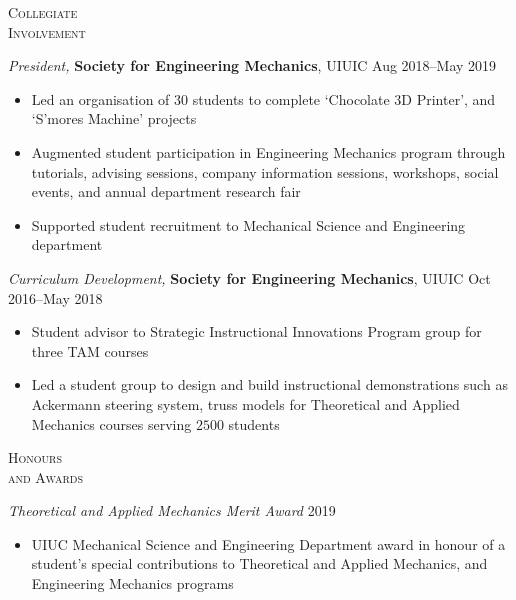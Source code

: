 \documentclass[10pt]{article}
\begin{document}
\begin{multicols}{2}
\textsc{\small Collegiate \\ Involvement}
\columnbreak

{\sl President,} \textbf{Society for Engineering Mechanics}, UIUIC \hfill Aug 2018--May 2019

\vspace{-1.75em}
\begin{itemize}[label=-]
    \setlength\itemsep{-0.25em}
    \item Led an organisation of $30$ students to complete `Chocolate 3D Printer', and `S'mores Machine' projects
    \item Augmented student participation in Engineering Mechanics program through tutorials, advising sessions, company information sessions, workshops, social events, and annual department research fair
    \item Supported student recruitment to Mechanical Science and Engineering department
\end{itemize}
\vspace{-2.0em}

\vspace{0.5em}
%
{\sl Curriculum Development,} \textbf{Society for Engineering Mechanics}, UIUIC \hfill Oct 2016--May 2018

\vspace{-1.75em}
\begin{itemize}[label=-]
    \setlength\itemsep{-0.25em}
    \item Student advisor to Strategic Instructional Innovations Program group for three TAM courses
    \item Led a student group to design and build instructional demonstrations such as  Ackermann steering system, truss models for Theoretical and Applied Mechanics courses serving $2500$ students
\end{itemize}
\vspace{-2.0em}

\end{multicols}
\vspace{-1.5em} 
\begin{multicols}{2}
\textsc{\small Honours \\ and Awards}
\columnbreak

{\sl Theoretical and Applied Mechanics Merit Award} \hfill 2019

\vspace{-1.75em}
\begin{itemize}[label= ]
    \setlength\itemsep{-0.25em}
    \item  UIUC Mechanical Science and Engineering Department award in honour of a student's special contributions to Theoretical and Applied Mechanics, and Engineering Mechanics programs
\end{itemize}
\vspace{-2.0em}

\end{multicols}
\end{document}
